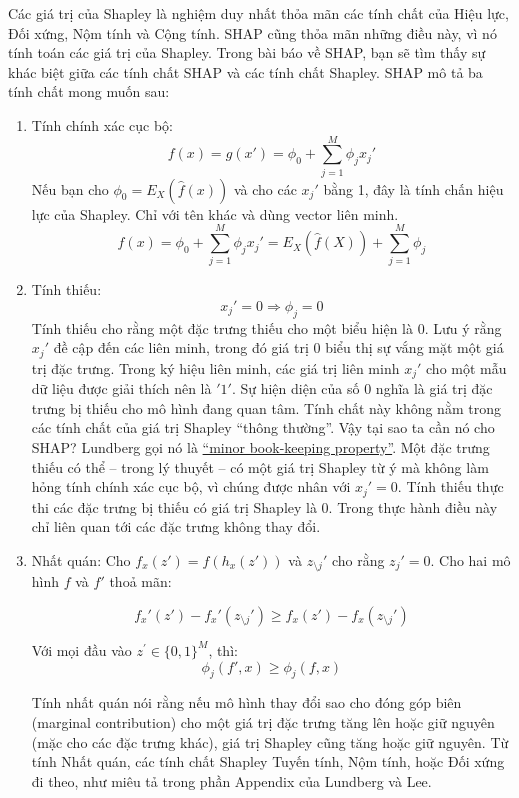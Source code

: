 Các giá trị của Shapley là nghiệm duy nhất thỏa mãn các tính chất của Hiệu lực, Đối xứng, Nộm tính và Cộng tính. SHAP cũng thỏa mãn những điều này, vì nó tính toán các giá trị của Shapley. Trong bài báo về SHAP, bạn sẽ tìm thấy sự khác biệt giữa các tính chất SHAP và các tính chất Shapley. SHAP mô tả ba tính chất mong muốn sau:

\begin{enumerate}
    \item Tính chính xác cục bộ:
    $$f(x)=g(x')=\phi_0+\sum_{j=1}^M\phi_jx_j'$$
    Nếu bạn cho $\phi_0=E_X(\hat{f}(x))$ và cho các $x_j'$ bằng 1, đây là tính chấn hiệu lực của Shapley. Chỉ với tên khác và dùng vector liên minh. 
    $$f(x)=\phi_0+\sum_{j=1}^M\phi_jx_j'=E_X(\hat{f}(X))+\sum_{j=1}^M\phi_j$$
    
\item Tính thiếu: 
$$x_j'=0\Rightarrow\phi_j=0$$
Tính thiếu cho rằng một đặc trưng thiếu cho một biểu hiện là 0. Lưu ý rằng $x_j'$ đề cập đến các liên minh, trong đó giá trị $0$ biểu thị sự vắng mặt một giá trị đặc trưng. Trong ký hiệu liên minh, các giá trị liên minh $x_j'$ cho một mẫu dữ liệu được giải thích nên là $'1'$. Sự hiện diện của số $0$ nghĩa là giá trị đặc trưng bị thiếu cho mô hình đang quan tâm. Tính chất này không nằm trong các tính chất của giá trị Shapley “thông thường”. Vậy tại sao ta cần nó cho SHAP? Lundberg gọi nó là \href{https://github.com/slundberg/shap/issues/175#issuecomment-407134438}{ ``minor book-keeping property''}. Một đặc trưng thiếu có thể -- trong lý thuyết – có một giá trị Shapley từ ý mà không làm hỏng tính chính xác cục bộ, vì chúng được nhân với $x_j' = 0$. Tính thiếu thực thi các đặc trưng bị thiếu có giá trị Shapley là 0. Trong thực hành điều này chỉ liên quan tới các đặc trưng không thay đổi.

\item Nhất quán:
Cho $f_x(z')=f(h_x(z'))$ và $z_{\setminus{}j}'$ cho rằng $z_j'=0$. Cho hai mô hình $f$ và $f'$ thoả mãn:

$$f_x'(z')-f_x'(z_{\setminus{}j}')\geq{}f_x(z')-f_x(z_{\setminus{}j}')$$

Với mọi đầu vào $z^{'} \in \{ 0, 1\} ^M$, thì: 
$$\phi_j(f',x)\geq\phi_j(f,x)$$

Tính nhất quán nói rằng nếu mô hình thay đổi sao cho đóng góp biên (marginal contribution) cho một giá trị đặc trưng tăng lên hoặc giữ nguyên (mặc cho các đặc trưng khác), giá trị Shapley cũng tăng hoặc giữ nguyên. Từ tính Nhất quán, các tính chất Shapley Tuyến tính, Nộm tính, hoặc Đối xứng đi theo, như miêu tả trong phần Appendix của Lundberg và Lee.


\end{enumerate}
